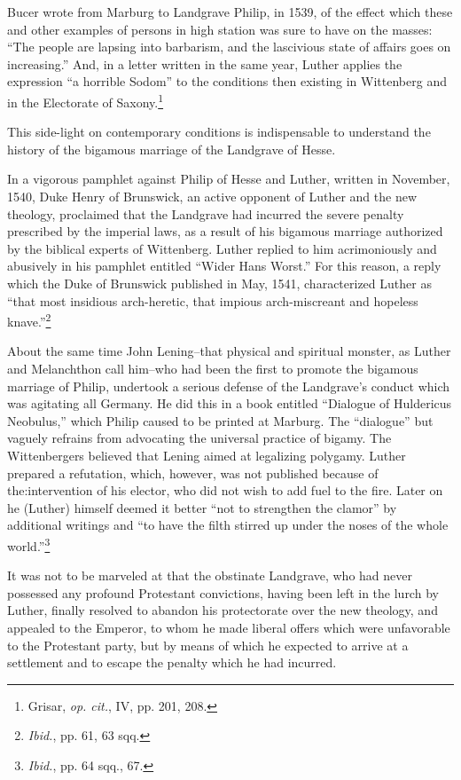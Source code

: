 Bucer wrote from Marburg to Landgrave Philip, in 1539, of the
effect which these and other examples of persons in high station was
sure to have on the masses: “The people are lapsing into barbarism,
and the lascivious state of affairs goes on increasing.” And, in a letter
written in the same year, Luther applies the expression “a horrible
Sodom” to the conditions then existing in Wittenberg and in the Electorate
of Saxony.\footnote{Grisar, \textit{op. cit.}, IV, pp. 201, 208.}

This side-light on contemporary conditions is indispensable to
understand the history of the bigamous marriage of the Landgrave of
Hesse.

In a vigorous pamphlet against Philip of Hesse and Luther, written
in November, 1540, Duke Henry of Brunswick, an active opponent of
Luther and the new theology, proclaimed that the Landgrave had incurred
the severe penalty prescribed by the imperial laws, as a result of his bigamous
marriage authorized by the biblical experts of Wittenberg. Luther replied to
him acrimoniously and abusively in his pamphlet entitled “Wider Hans
Worst.” For this reason, a reply which the Duke of Brunswick published
in May, 1541, characterized Luther as “that most insidious arch-heretic,
that impious arch-miscreant and hopeless knave.”\footnote{\textit{Ibid.}, pp. 61, 63 sqq.}

About the same time John Lening--that physical and spiritual monster,
as Luther and Melanchthon call him--who had been the first to promote the
bigamous marriage of Philip, undertook a serious defense of the Landgrave’s
conduct which was agitating all Germany. He did this in a book entitled
“Dialogue of Huldericus Neobulus,” which Philip caused to be printed at
Marburg. The “dialogue” but vaguely refrains from advocating the universal
practice of bigamy. The Wittenbergers believed that Lening aimed
at legalizing polygamy. Luther prepared a refutation, which, however, was
not published because of the:intervention of his elector, who did not wish
to add fuel to the fire. Later on he (Luther) himself deemed it better “not
to strengthen the clamor” by additional writings and “to have the filth
stirred up under the noses of the whole world.”\footnote{\textit{Ibid.}, pp. 64 sqq., 67.}

It was not to be marveled at that the obstinate Landgrave, who had
never possessed any profound Protestant convictions, having been
left in the lurch by Luther, finally resolved to abandon his protectorate
over the new theology, and appealed to the Emperor, to whom he
made liberal offers which were unfavorable to the Protestant party,
but by means of which he expected to arrive at a settlement and to
escape the penalty which he had incurred.

